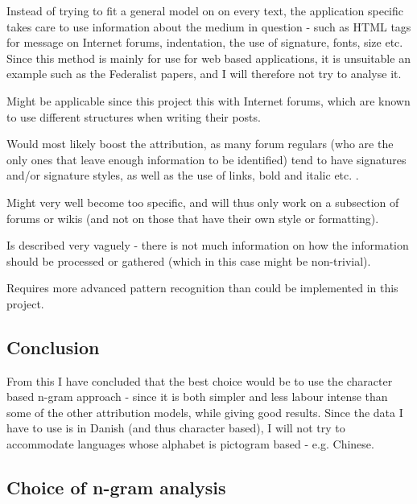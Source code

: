 {\label{application}
Instead of trying to fit a general model on on every text, the application specific takes care to use information about the medium in question - such as HTML tags for message on Internet forums, indentation, the use of signature, fonts, size etc.
}
{
Since this method is mainly for use for web based applications, it is unsuitable an example such as the Federalist papers, and I will therefore not try to analyse it. 
}
{
\item Might be applicable since this project this with Internet forums, which are known to use different structures when writing their posts.
\item Would most likely boost the attribution, as many forum regulars (who are the only ones that leave enough information to be identified) tend to have signatures and/or signature styles, as well as the use of links, bold and italic etc. .
}{
\item Might very well become too specific, and will thus only work on a subsection of forums or wikis (and not on those that have their own style or formatting).
\item Is described very vaguely - there is not much information on how the information should be processed or gathered (which in this case might be non-trivial).
\item Requires more advanced pattern recognition than could be implemented in this project. 
}

\subsection{Conclusion}
\label{technique:conclusion}
From this I have concluded that the best choice would be to use the character based n-gram approach - since it is both simpler and less labour intense than some of the other attribution models, while giving good results. Since the data I have to use is in Danish (and thus character based), I will not try to accommodate languages whose alphabet is pictogram based - e.g. Chinese.


\subsection{Choice of n-gram analysis}

